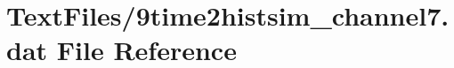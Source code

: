 \hypertarget{9time2histsim__channel7_8dat}{}\section{Text\+Files/9time2histsim\+\_\+channel7.dat File Reference}
\label{9time2histsim__channel7_8dat}
